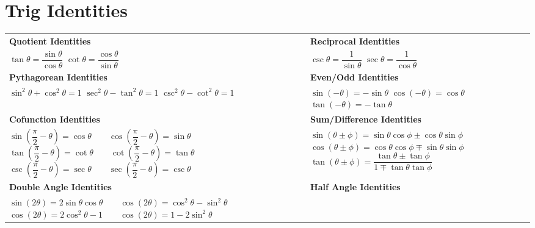 \documentclass[oneside]{book}
\numberwithin{figure}{section}
\numberwithin{equation}{section}
\theoremstyle{definition}
\begin{document}
	\section{Trig Identities}
	\bgroup
	\renewcommand\cellgape{\Gape[5pt]}
	\setlength\extrarowheight{5pt}
	\renewcommand\cellset{\renewcommand\arraystretch{2}%
		\setlength\extrarowheight{0pt}}
	\begin{tabularx}{\columnwidth}{Y Y}
		\textbf{Quotient Identities} & \textbf{Reciprocal Identities}\\
		\makecell[c]{$ \tan\theta = \dfrac{\sin\theta}{\cos\theta} $\\
			$ \cot\theta = \dfrac{\cos\theta}{\sin\theta} $} & \\
		\textbf{Pythagorean Identities} & \textbf{Even/Odd Identities}\\
		 & \makecell[c]{$ \sin(-\theta) = -\sin\theta $\\
			$ \cos(-\theta) = \cos\theta $\\
			$ \tan(-\theta) = -\tan\theta $}\\
		\textbf{Cofunction Identities} & \textbf{Sum/Difference Identities}\\
		 & \makecell[c]{$ \sin(\theta \pm \phi) = \sin\theta\cos\phi \pm \cos\theta\sin\phi $\\
			$ \cos(\theta \pm \phi) = \cos\theta\cos\phi \mp \sin\theta\sin\phi $\\
			$ \tan(\theta \pm \phi) = \dfrac{\tan\theta \pm \tan\phi}{1 \mp \tan\theta\tan\phi} $}\\
		\textbf{Double Angle Identities} & \textbf{Half Angle Identities}\\
\end{tabularx}
\end{document}
